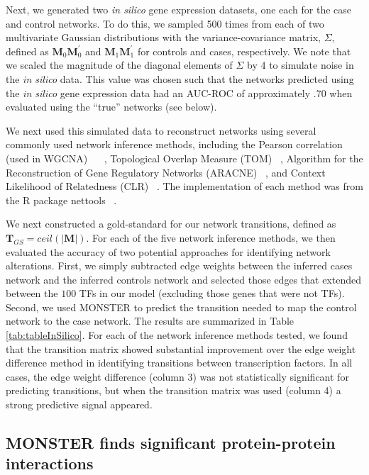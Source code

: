 Next, we generated two \emph{in silico} gene expression datasets, one each for the case and control networks. To do this, we sampled 500 times from each of two multivariate Gaussian distributions with the variance-covariance matrix, $\Sigma$, defined as $\mathbf{M}_{0}\mathbf{M}_{0}^{\prime}$ and $\mathbf{M}_{1}\mathbf{M}_{1}^{\prime}$ for controls and cases, respectively. We note that we scaled the magnitude of the diagonal elements of $\Sigma$ by 4 to simulate noise in the \emph{in silico} data. This value was chosen such that the networks predicted using the \emph{in silico} gene expression data had an AUC-ROC of approximately .70 when evaluated using the ``true'' networks (see below).

We next used this simulated data to reconstruct networks using several commonly used network inference methods, including the Pearson correlation (used in WGCNA) ~\cite{Langfelder2008WGCNA} ~\cite{Langfelder2008FastR}, Topological Overlap Measure (TOM) ~\cite{ravasz2002hierarchical}, Algorithm for the Reconstruction of Gene Regulatory Networks (ARACNE) ~\cite{margolin2006aracne}, and Context Likelihood of Relatedness (CLR) ~\cite{faith2007large}. The implementation of each method was from the R package nettools ~\cite{nettools}.

We next constructed a gold-standard for our network transitions, defined as $\mathbf{T}_{GS}=ceil(|\mathbf{M}|)$. For each of the five network inference methods, we then evaluated the accuracy of two potential approaches for identifying network alterations. First, we simply subtracted edge weights between the inferred cases network and the inferred controls network and selected those edges that extended between the $100$ TFs in our model (excluding those genes that were not TFs). Second, we used MONSTER to predict the transition needed to map the control network to the case network. The results are summarized in Table \ref{tab:tableInSilico}. For each of the network inference methods tested, we found that the transition matrix showed substantial improvement over the edge weight difference method in identifying transitions between transcription factors. In all cases, the edge weight difference (column 3) was not statistically significant for predicting transitions, but when the transition matrix was used (column 4) a strong predictive signal appeared. 

\subsection*{MONSTER finds significant protein-protein interactions}

